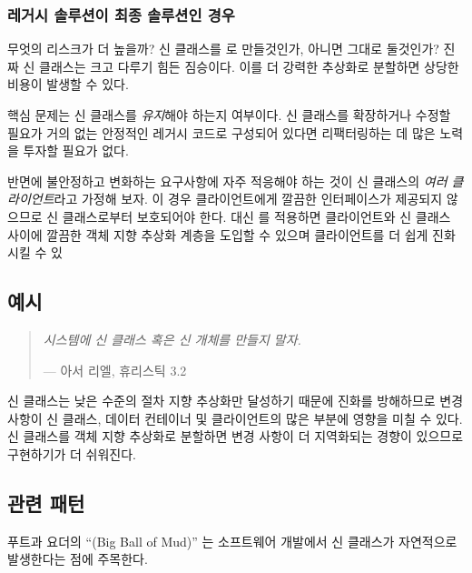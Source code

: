 \documentclass[a4paper,10pt,twoside]{book}
\begin{document}
\subsubsection*{레거시 솔루션이 최종 솔루션인 경우}

무엇의 리스크가 더 높을까? 신 클래스를 로 만들것인가, 아니면 그대로 둘것인가? 진짜 신 클래스는 크고 다루기 힘든 짐승이다. 이를 더 강력한 추상화로 분할하면 상당한 비용이 발생할 수 있다.

핵심 문제는 신 클래스를 \emph{유지}해야 하는지 여부이다. 신 클래스를 확장하거나 수정할 필요가 거의 없는 안정적인 레거시 코드로 구성되어 있다면 리팩터링하는 데 많은 노력을 투자할 필요가 없다.

반면에 불안정하고 변화하는 요구사항에 자주 적응해야 하는 것이 신 클래스의 \emph{여러 클라이언트}라고 가정해 보자. 이 경우 클라이언트에게 깔끔한 인터페이스가 제공되지 않으므로 신 클래스로부터 보호되어야 한다. 대신 를 적용하면 클라이언트와 신 클래스 사이에 깔끔한 객체 지향 추상화 계층을 도입할 수 있으며 클라이언트를 더 쉽게 진화시킬 수 있

\subsection*{예시}

\begin{quotation}
\emph{시스템에 신 클래스 혹은 신 개체를 만들지 말자.}

\hfill --- 아서 리엘, 휴리스틱 3.2 \cite{Riel96a}
\end{quotation}

신 클래스는 낮은 수준의 절차 지향 추상화만 달성하기 때문에 진화를 방해하므로 변경 사항이 신 클래스, 데이터 컨테이너 및 클라이언트의 많은 부분에 영향을 미칠 수 있다. 신 클래스를 객체 지향 추상화로 분할하면 변경 사항이 더 지역화되는 경향이 있으므로 구현하기가 더 쉬워진다.

\subsection*{관련 패턴}

푸트과 요더의 ``(Big Ball of Mud)'' \cite{Foot00a}는 소프트웨어 개발에서 신 클래스가 자연적으로 발생한다는 점에 주목한다. 
\end{document}

